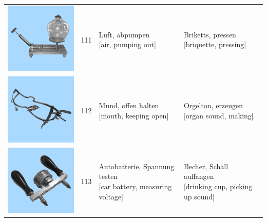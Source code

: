 \documentclass[
  english,
  man,floatsintext]{apa7}
\begin{document}
\begin{center}
\begin{ThreePartTable}
{\begin{longtable}{llll}
\includegraphics[valign=c, scale=0.23]{../materials/unfamiliar/111.png} & 111 & \makecell[l]{Luft, abpumpen\\{[air, pumping out]}} & \makecell[l]{Briketts, pressen\\{[briquette, pressing]}}\\
\includegraphics[valign=c, scale=0.23]{../materials/unfamiliar/112.png} & 112 & \makecell[l]{Mund, offen halten\\{[mouth, keeping open]}} & \makecell[l]{Orgelton, erzeugen\\{[organ sound, making]}}\\
\includegraphics[valign=c, scale=0.23]{../materials/unfamiliar/113.png} & 113 & \makecell[l]{Autobatterie, Spannung testen\\{[car battery, measuring voltage]}} & \makecell[l]{Becher, Schall auffangen\\{[drinking cup, picking up sound]}}\\

\end{longtable}}
\end{ThreePartTable}
\end{center}
\end{document}
